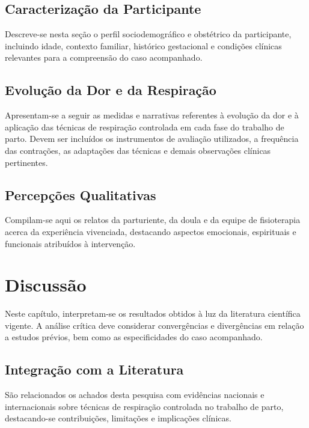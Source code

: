 \documentclass[openright]{tex/estilos/normas-utf-tex}
\begin{document}
\section{Caracterização da Participante}
\label{sec:caracterizacao}

Descreve-se nesta seção o perfil sociodemográfico e obstétrico da participante, incluindo idade, contexto familiar, histórico gestacional e condições clínicas relevantes para a compreensão do caso acompanhado.

\section{Evolução da Dor e da Respiração}
\label{sec:evolucao}

Apresentam-se a seguir as medidas e narrativas referentes à evolução da dor e à aplicação das técnicas de respiração controlada em cada fase do trabalho de parto. Devem ser incluídos os instrumentos de avaliação utilizados, a frequência das contrações, as adaptações das técnicas e demais observações clínicas pertinentes.

\section{Percepções Qualitativas}
\label{sec:percepcoes}

Compilam-se aqui os relatos da parturiente, da doula e da equipe de fisioterapia acerca da experiência vivenciada, destacando aspectos emocionais, espirituais e funcionais atribuídos à intervenção.

\chapter{Discussão}
\label{chap:discussao}

Neste capítulo, interpretam-se os resultados obtidos à luz da literatura científica vigente. A análise crítica deve considerar convergências e divergências em relação a estudos prévios, bem como as especificidades do caso acompanhado.

\section{Integração com a Literatura}
\label{sec:integracao-literatura}

São relacionados os achados desta pesquisa com evidências nacionais e internacionais sobre técnicas de respiração controlada no trabalho de parto, destacando-se contribuições, limitações e implicações clínicas.
\end{document}

